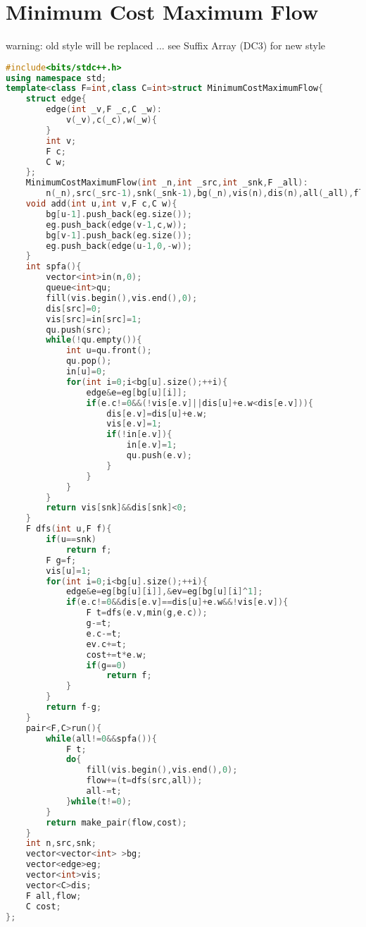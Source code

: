 \documentclass{book}
\begin{document}
\section{Minimum Cost Maximum Flow}
warning: old style will be replaced ... see Suffix Array (DC3) for new style\begin{lstlisting}[language=C++,title={Minimum Cost Maximum Flow.hpp (2278 bytes, 82 lines)}]
#include<bits/stdc++.h>
using namespace std;
template<class F=int,class C=int>struct MinimumCostMaximumFlow{
    struct edge{
        edge(int _v,F _c,C _w):
            v(_v),c(_c),w(_w){
        }
        int v;
        F c;
        C w;
    };
    MinimumCostMaximumFlow(int _n,int _src,int _snk,F _all):
        n(_n),src(_src-1),snk(_snk-1),bg(_n),vis(n),dis(n),all(_all),flow(0),cost(0){}
    void add(int u,int v,F c,C w){
        bg[u-1].push_back(eg.size());
        eg.push_back(edge(v-1,c,w));
        bg[v-1].push_back(eg.size());
        eg.push_back(edge(u-1,0,-w));
    }
    int spfa(){
        vector<int>in(n,0);
        queue<int>qu;
        fill(vis.begin(),vis.end(),0);
        dis[src]=0;
        vis[src]=in[src]=1;
        qu.push(src);
        while(!qu.empty()){
            int u=qu.front();
            qu.pop();
            in[u]=0;
            for(int i=0;i<bg[u].size();++i){
                edge&e=eg[bg[u][i]];
                if(e.c!=0&&(!vis[e.v]||dis[u]+e.w<dis[e.v])){
                    dis[e.v]=dis[u]+e.w;
                    vis[e.v]=1;
                    if(!in[e.v]){
                        in[e.v]=1;
                        qu.push(e.v);
                    }
                }
            }
        }
        return vis[snk]&&dis[snk]<0;
    }
    F dfs(int u,F f){
        if(u==snk)
            return f;
        F g=f;
        vis[u]=1;
        for(int i=0;i<bg[u].size();++i){
            edge&e=eg[bg[u][i]],&ev=eg[bg[u][i]^1];
            if(e.c!=0&&dis[e.v]==dis[u]+e.w&&!vis[e.v]){
                F t=dfs(e.v,min(g,e.c));
                g-=t;
                e.c-=t;
                ev.c+=t;
                cost+=t*e.w;
                if(g==0)
                    return f;
            }
        }
        return f-g;
    }
    pair<F,C>run(){
        while(all!=0&&spfa()){
            F t;
            do{
                fill(vis.begin(),vis.end(),0);
                flow+=(t=dfs(src,all));
                all-=t;
            }while(t!=0);
        }
        return make_pair(flow,cost);
    }
    int n,src,snk;
    vector<vector<int> >bg;
    vector<edge>eg;
    vector<int>vis;
    vector<C>dis;
    F all,flow;
    C cost;
};
\end{lstlisting}
\end{document}

